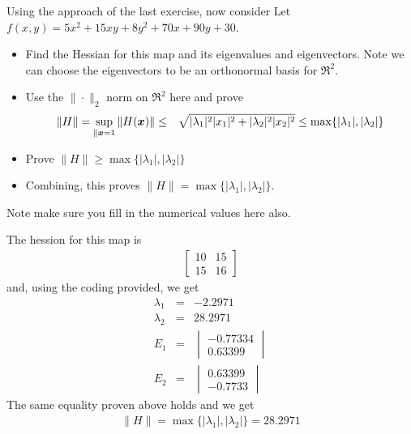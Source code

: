 \documentclass[11pt]{SelfArxOneColBMN}
\begin{document}
\begin{exercise}
Using the approach of the last exercise, now consider
Let $f(x,y) = 5x^2 + 15xy + 8y^2 + 70x + 90y + 30$.
\begin{itemize}
\item Find the Hessian for this map and its eigenvalues and eigenvectors.
Note we can choose the eigenvectors to be an orthonormal basis for $\Re^2$.
\item Use the $\| \cdot\|_2$ norm on $\Re^2$ here and prove
\begin{eqnarray*}
\|H\| = \sup_{\|\boldsymbol{x} = 1} \|H(\boldsymbol{x})\| & \leq & \sqrt{|\lambda_1|^2 |x_1|^2 + |\lambda_2|^2 |x_2|^2}
\leq \max\{ |\lambda_1|,|\lambda_2|\}
\end{eqnarray*}
\item Prove $\|H\|  \geq \max\{ |\lambda_1|,|\lambda_2|\}$
\item Combining, this proves $\|H\|  = \max\{ |\lambda_1|,|\lambda_2|\}$.
\end{itemize}
\noindent
Note make sure you fill in the numerical values here also.
\end{exercise}

\begin{solution}
  The hession for this map is
  \begin{eqnarray*}
    \begin{bmatrix}
      10 & 15\\
      15 & 16
    \end{bmatrix}
  \end{eqnarray*}
  and, using the coding provided, we get
  \begin{eqnarray*}
    \lambda_1 &=& -2.2971\\
    \lambda_2 &=& 28.2971\\
    E_1 &=&
    \begin{vmatrix}
      -0.77334\\
      0.63399
    \end{vmatrix}
    \\
    E_2 &=&
    \begin{vmatrix}
      0.63399\\
      -0.7733
    \end{vmatrix} 
  \end{eqnarray*}
  The same equality proven above holds and we get
  \begin{eqnarray*}
    \|H\|  = \max\{ |\lambda_1|,|\lambda_2|\} = 28.2971
  \end{eqnarray*}
\end{solution}
\end{document}
